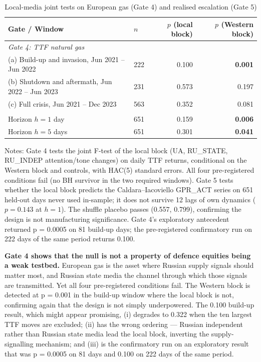 \documentclass[12pt,a4paper]{article}
\begin{document}
\begin{table}[H]
\centering
\caption{Local-media joint tests on European gas (Gate 4) and realised escalation (Gate 5)}
\label{tab:gates45}
\begin{threeparttable}
\begin{tabular}{llrr}
\toprule
Gate / Window & $n$ & $p$ (local block) & $p$ (Western block) \\
\midrule
\multicolumn{4}{l}{\textit{Gate 4: TTF natural gas}} \\
(a) Build-up and invasion, Jun 2021 -- Jun 2022 & 222 & 0.100 & \textbf{0.001} \\
(b) Shutdown and aftermath, Jun 2022 -- Jun 2023 & 231 & 0.573 & 0.197 \\
(c) Full crisis, Jun 2021 -- Dec 2023 & 563 & 0.352 & 0.081 \\
\addlinespace
\multicolumn{4}{l}{\textit{Gate 5: realised escalation (GPR\_ACT), held-out sample}} \\
Horizon $h=1$ day & 651 & 0.159 & \textbf{0.006} \\
Horizon $h=5$ days & 651 & 0.301 & \textbf{0.041} \\
\bottomrule
\end{tabular}
\begin{tablenotes}
\small
\item Notes: Gate 4 tests the joint F-test of the local block (UA, RU\_STATE, RU\_INDEP attention/tone changes) on daily TTF returns, conditional on the Western block and controls, with HAC(5) standard errors. All four pre-registered conditions fail (no BH survivor in the two required windows). Gate 5 tests whether the local block predicts the Caldara--Iacoviello GPR\_ACT series on 651 held-out days never used in-sample; it does not survive 12 lags of own dynamics ($p = 0.143$ at $h=1$). The shuffle placebo passes (0.557, 0.799), confirming the design is not manufacturing significance. Gate 4's exploratory antecedent returned p = 0.0005 on 81 build-up days; the pre-registered confirmatory run on 222 days of the same period returns 0.100.
\end{tablenotes}
\end{threeparttable}
\end{table}

\textbf{Gate 4 shows that the null is not a property of defence equities being a weak testbed.} European gas is the asset where Russian supply signals should matter most, and Russian state media the channel through which those signals are transmitted. Yet all four pre-registered conditions fail. The Western block is detected at p = 0.001 in the build-up window where the local block is not, confirming again that the design is not simply underpowered. The 0.100 build-up result, which might appear promising, (i) degrades to 0.322 when the ten largest TTF moves are excluded; (ii) has the wrong ordering --- Russian independent rather than Russian state media lead the local block, inverting the supply-signalling mechanism; and (iii) is the confirmatory run on an exploratory result that was p = 0.0005 on 81 days and 0.100 on 222 days of the same period.
\end{document}
